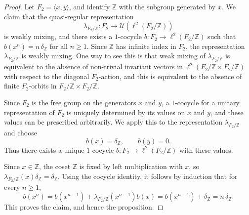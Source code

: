 \documentclass[10pt,a4paper]{amsart}
\begin{document}
\begin{proof}

Let $F_2=\langle x,y\rangle$, and identify $\mathbb Z$ with the subgroup generated by $x$. We claim that the quasi-regular representation
\[
\lambda_{F_2/\mathbb Z}\colon F_2\to \mathcal U(\ell^2(F_2/\mathbb Z))
\]
is weakly mixing, and there exists a $1$-cocycle
$
b\colon F_2\to \ell^2(F_2/\mathbb Z)
$
such that
$
b(x^n)=n\,\delta_{\mathbb Z}
$ for all $n\ge 1$.
Since $\mathbb Z$ has infinite index in $F_2$, the representation $\lambda_{F_2/\mathbb Z}$ is weakly mixing. One way to see this is that weak mixing of $\lambda_{F_2/\mathbb Z}$ is equivalent to the absence of non-trivial invariant vectors in $\ell^2(F_2/\mathbb Z \times F_2/\mathbb Z)$ with respect to the diagonal $F_2$-action, and this is equivalent to the absence of finite $F_2$-orbits in
$
F_2/\mathbb Z\times F_2/\mathbb Z.
$

Since $F_2$ is the free group on the generators $x$ and $y$, a $1$-cocycle for a unitary representation of $F_2$ is uniquely determined by its values on $x$ and $y$, and these values can be prescribed arbitrarily. We apply this to the representation $\lambda_{F_2/\mathbb Z}$ and choose
\[
b(x)=\delta_{\mathbb Z},
\qquad
b(y)=0.
\]
Thus there exists a unique $1$-cocycle
$
b\colon F_2\to \ell^2(F_2/\mathbb Z)
$
with these values.

Since $x\in \mathbb Z$, the coset $\mathbb Z$ is fixed by left multiplication with $x$, so
$
\lambda_{F_2/\mathbb Z}(x)\delta_{\mathbb Z}=\delta_{\mathbb Z}.
$
Using the cocycle identity, it follows by induction that for every $n\ge 1$,
\[
b(x^n)=b(x^{n-1})+\lambda_{F_2/\mathbb Z}(x^{n-1})b(x)=b(x^{n-1})+\delta_{\mathbb Z}=n\,\delta_{\mathbb Z}.
\]
This proves the claim, and hence the proposition.
\end{proof}
\end{document}
